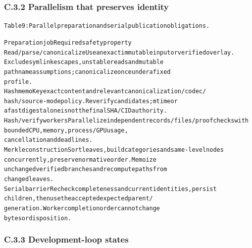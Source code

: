 \subsubsection*{C.3.2 Parallelism that preserves identity}


\begingroup\fontsize{7}{8.4}\selectfont
\begin{alltt}
Table 9: Parallel preparation and serial publication obligations.
\end{alltt}\endgroup

\begingroup\fontsize{7}{8.4}\selectfont
\begin{alltt}
Preparation job                             Required safety property
Read / parse / canonicalize                 Use an exact immutable input or verified overlay.
                                            Exclude symlink escapes, unstable reads and mutable
                                            pathname assumptions; canonicalize once under a fixed
                                            profile.
Hash memo                                   Key exact content and relevant canonicalization/codec/
                                            hash/source-mode policy. Reverify candidates; mtime or
                                            a fast digest alone is not the final SHA/CID authority.
Hash / verify workers                       Parallelize independent records/files/proof checks with
                                            bounded CPU, memory, process/GPU usage,
                                            cancellation and deadlines.
Merkle construction                         Sort leaves, build categories and same-level nodes
                                            concurrently, preserve normative order. Memoize
                                            unchanged verified branches and recompute paths from
                                            changed leaves.
Serial barrier                              Recheck completeness and current identities, persist
                                            children, then use the accepted expected parent/
                                            generation. Worker completion order cannot change
                                            bytes or disposition.
\end{alltt}\endgroup



\subsubsection*{C.3.3 Development-loop states}

